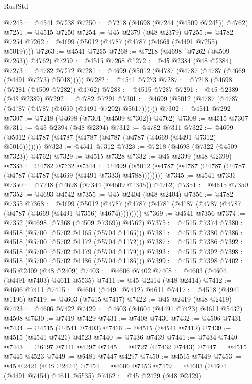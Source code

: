 \begin{lexlean}{RustStd}
\begin{coremodule}
@7245 := @4541 @7238
@7250 := @7218 (@4698 (@7244 (@4509 @7245)) @4762)
@7251 := @4515 @7250
@7254 := @45 @2379 (@48 @2379)
@7255 := @4782 @7254
@7262 := @4699 (@5012 (@4787 (@4787 (@4669 (@4491 @7255) @5019))))
@7263 := @4541 @7255
@7268 := @7218 (@4698 (@7262 (@4509 @7263)) @4762)
@7269 := @4515 @7268
@7272 := @45 @2384 (@48 @2384)
@7273 := @4782 @7272
@7281 := @4699 (@5012 (@4787 (@4787 (@4787 (@4669 (@4491 @7273) @5018)))))
@7282 := @4541 @7273
@7287 := @7218 (@4698 (@7281 (@4509 @7282)) @4762)
@7288 := @4515 @7287
@7291 := @45 @2389 (@48 @2389)
@7292 := @4782 @7291
@7301 := @4699 (@5012 (@4787 (@4787 (@4787 (@4787 (@4669 (@4491 @7292) @5017))))))
@7302 := @4541 @7292
@7307 := @7218 (@4698 (@7301 (@4509 @7302)) @4762)
@7308 := @4515 @7307
@7311 := @45 @2394 (@48 @2394)
@7312 := @4782 @7311
@7322 := @4699 (@5012 (@4787 (@4787 (@4787 (@4787 (@4787 (@4669 (@4491 @7312) @5016)))))))
@7323 := @4541 @7312
@7328 := @7218 (@4698 (@7322 (@4509 @7323)) @4762)
@7329 := @4515 @7328
@7332 := @45 @2399 (@48 @2399)
@7333 := @4782 @7332
@7344 := @4699 (@5012 (@4787 (@4787 (@4787 (@4787 (@4787 (@4787 (@4669 (@4491 @7333) @4788))))))))
@7345 := @4541 @7333
@7350 := @7218 (@4698 (@7344 (@4509 @7345)) @4762)
@7351 := @4515 @7350
@7352 := @4693 @4542
@7355 := @45 @2404 (@48 @2404)
@7356 := @4782 @7355
@7368 := @4699
    (@5012 (@4787 (@4787 (@4787 (@4787 (@4787 (@4787 (@4787 (@4669 (@4491 @7356) @4674)))))))))
@7369 := @4541 @7356
@7374 := @7352 (@4698 (@7368 (@4509 @7369)) @4762)
@7375 := @4515 @7374
@7380 := @4518 (@5700 (@5702 @1165 (@5704 @1165)))
@7381 := @4515 @7380
@7386 := @4518 (@5700 (@5702 @1172 (@5704 @1172)))
@7387 := @4515 @7386
@7392 := @4518 (@5700 (@5702 @1179 (@5704 @1179)))
@7393 := @4515 @7392
@7398 := @4518 (@5700 (@5702 @1186 (@5704 @1186)))
@7399 := @4515 @7398
@7402 := @45 @2409 (@48 @2409)
@7403 := @4606 @7402
@7408 := @4603 (@4604 (@4491 @7403) @4611 @5535)
@7411 := @45 @2414 (@48 @2414)
@7412 := @4606 @7411
@7415 := @4604 (@4491 @7412) @4611
@7417 := @4518 (@4941 @1196)
@7419 := @4603 (@7415 @7417)
@7422 := @45 @2419 (@48 @2419)
@7423 := @4606 @7422
@7429 := @4603 (@4604 (@4491 @7423) @4611 @5432) @4508
@7430 := @7419 @7429
@7431 := @7408 @7430
@7432 := @4506 @7431
@7434 := @4515 (@4541 @7403)
@7436 := @4515 (@4541 @7412)
@7439 := @4515 (@4541 @7423) @4523
@7440 := @7436 @7439
@7441 := @7434 @7440
@7443 := @6197 @7441 @4297
@7445 := @4727 (@7432 @7443)
@7447 := @4515 @7445 @4523
@7449 := @6481 @7447 @4297
@7450 := @4515 @7449
@7453 := @45 @2424 (@48 @2424)
@7454 := @4606 @7453
@7459 := @4603 (@4604 (@4491 @7454) @4611 @5535)
@7462 := @45 @2429 (@48 @2429)

\end{coremodule}
\end{lexlean}

